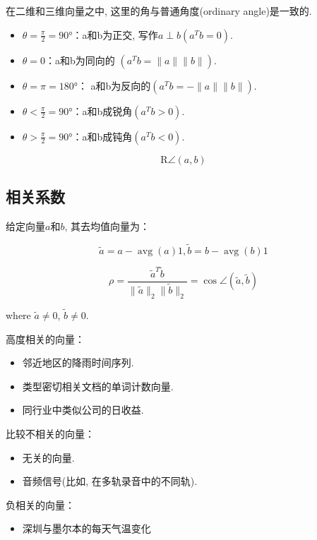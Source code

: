 在二维和三维向量之中, 这里的角与普通角度(ordinary angle)是一致的. 

\begin{itemize}
    \item $\theta =\frac{\pi}{2}=90°$：a和b为正交, 写作$a \perp b (a ^T b  =0)$. 
    \item $\theta =0$：a和b为同向的 $(a ^T  b=\| a \| \| b  \| )$. 
    \item $\theta =\pi =180°$： a和b为反向的$(a ^T   b  = - \| a \| \| b \| )$. 
    \item $\theta <\frac{\pi}{2}=90°$：a和b成锐角$(a ^T b >0)$. 
    \item $\theta >\frac{\pi}{2}=90°$：a和b成钝角$(a ^T b <0)$. 
\end{itemize}

\begin{definition}[球面的距离]
    $$  \mathrm{R} \angle(a, b) $$
\end{definition}

\subsection{相关系数}

给定向量$a$和$b$, 其去均值向量为：

$$ \tilde{a}=a-\operatorname{avg}(a) 1,  \tilde{b}=b-\operatorname{avg}(b) 1 $$

\begin{definition}[$a$和$b$的相关系数]
    $$ \rho=\frac{\tilde{a}^{T} \tilde{b}}{\|\tilde{a}\|_{2}\|\tilde{b}\|_{2}} = \cos \angle (\tilde{a}, \tilde{b}) $$

    where  $ \tilde{a} \neq 0 $,  $ \tilde{b} \neq 0 $.
\end{definition}

\begin{example}
    高度相关的向量：
\begin{itemize}
    \item 邻近地区的降雨时间序列. 
    \item 类型密切相关文档的单词计数向量. 
    \item 同行业中类似公司的日收益. 
\end{itemize}

比较不相关的向量：
\begin{itemize}
    \item 无关的向量. 
    \item 音频信号(比如, 在多轨录音中的不同轨). 
\end{itemize}

负相关的向量：
\begin{itemize}
    \item 深圳与墨尔本的每天气温变化
\end{itemize}
\end{example}
